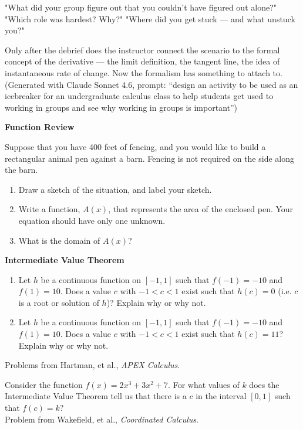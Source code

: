\documentclass{ximera}
\begin{document}
\begin{exercise}
"What did your group figure out that you couldn't have figured out alone?"
"Which role was hardest? Why?"
"Where did you get stuck — and what unstuck you?"

Only after the debrief does the instructor connect the scenario to the formal concept of the derivative — the limit definition, the tangent line, the idea of instantaneous rate of change. Now the formalism has something to attach to.\\
(Generated with Claude Sonnet 4.6, prompt: ``design an activity to be used as an icebreaker for an undergraduate calculus class to help students get used to working in groups and see why working in groups is important'')
\end{exercise}


\textbf{Function Review}
 \begin{exercise}
   Suppose that you have 400 feet of fencing, and you would like to build a rectangular animal pen against a barn.  Fencing is not required on the side along the barn.  
    \begin{enumerate}
        \item Draw a sketch of the situation, and label your sketch. 
        \item Write a function, $A(x)$, that represents the area of the enclosed pen.  Your equation should have only one unknown.
        \item What is the domain of $A(x)$?
    \end{enumerate}
 \end{exercise}

 \textbf{Intermediate Value Theorem}
  \begin{exercise}
      \begin{enumerate}
         \item Let $h$ be a continuous function on $[-1,1]$ such that $f(-1)=-10$ and $f(1)=10$.  Does a value $c$ with $-1<c<1$ exist such that $h(c)=0$ (i.e. $c$ is a root or solution of $h$)?  Explain why or why not.
         \item Let $h$ be a continuous function on $[-1,1]$ such that $f(-1)=-10$ and $f(1)=10$.  Does a value $c$ with $-1<c<1$ exist such that $h(c)=11$?  Explain why or why not.
      \end{enumerate}
      Problems from Hartman, et al., \textit{APEX Calculus}.
  \end{exercise}

  \begin{exercise}
      Consider the function $f(x)=2x^3+3x^2+7$. For what values of $k$ does the Intermediate Value Theorem tell us that there is a $c$ in the interval $[0,1]$ such that $f(c)=k$? \\
      Problem from Wakefield, et al., \textit{Coordinated Calculus}.
  \end{exercise}
\end{document}
